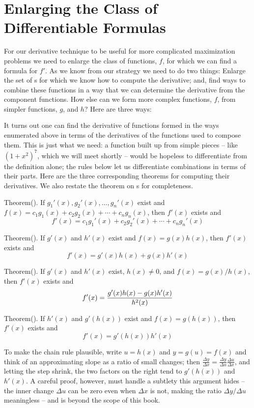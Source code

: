 \section{Enlarging the Class of Differentiable Formulas}
For our derivative technique to be useful for more complicated maximization 
problems we need to enlarge the class of functions, $f$, for which we can 
find a formula for $f'$.
As we know from our strategy we need to do two things: Enlarge the set 
of s for which we know how to compute the derivative;
and, find ways to combine these functions in a way that we can determine the 
derivative from the component functions. 
How else can we form more complex functions, 
$f$, from simpler functions, $g$, and $h$? Here are three ways:

\beginEnum
{}
\endEnum

It turns out one can find the derivative of functions formed in the ways
enumerated above in terms of the derivatives of the functions used to compose
them. This is just what we need: a function built up from simple pieces --
like $(1 + x^2)^7$, which we will meet shortly -- would be hopeless to
differentiate from the definition alone; the rules below let us differentiate
combinations in terms of their parts.
Here are the three corresponding theorems for computing their derivatives.
We also restate the theorem on s for completeness.

\proclaim Theorem(). If $g_1'(x), g_2'(x), \ldots, g_n'(x)$ exist and
$f(x) = c_1 g_1(x) + c_2 g_2(x) + \cdots + c_n g_n(x)$, then $f'(x)$ exists and
$$
f'(x) = c_1 g_1'(x) + c_2 g_2'(x) + \cdots + c_n g_n'(x)
$$

\proclaim Theorem(). If $g'(x)$ and $h'(x)$ exist and
$f(x) = g(x) h(x)$, then $f'(x)$ exists and
$$
f'(x) = g'(x) h(x) + g(x) h'(x)
$$

\proclaim Theorem(). If $g'(x)$ and $h'(x)$ exist,
$h(x) \neq 0$, and $f(x) = g(x) / h(x)$, then $f'(x)$ exists and
$$
f'(x) = {g'(x) h(x) - g(x) h'(x) \over h^2(x) }
$$

\proclaim Theorem(). If $h'(x)$ and $g'(h(x))$ exist and
$f(x) = g(h(x))$, then $f'(x)$ exists and
$$
f'(x) = g'(h(x)) h'(x)
$$

To make the chain rule plausible, write $u = h(x)$ and $y = g(u) = f(x)$ and
think of an approximating slope as a ratio of small changes; then
$\frac{\Delta y}{\Delta x} = \frac{\Delta y}{\Delta u} \frac{\Delta u}{\Delta x}$,
and letting the step shrink, the two factors on the right tend to $g'(h(x))$
and $h'(x)$. A careful proof, however, must handle a subtlety this argument
hides -- the inner change $\Delta u$ can be zero even when $\Delta x$ is
not, making the ratio $\Delta y / \Delta u$ meaningless -- and is beyond
the scope of this book.

